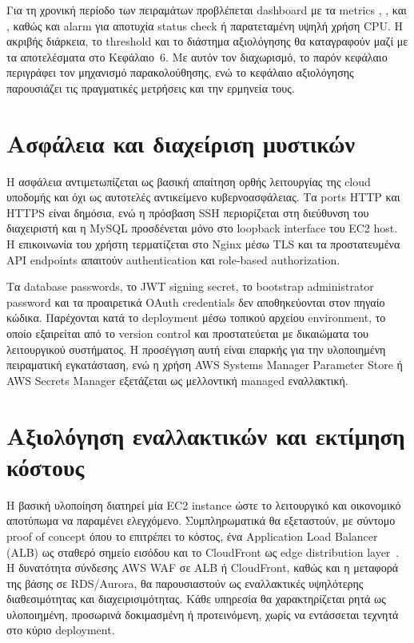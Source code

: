 Για τη χρονική περίοδο των πειραμάτων προβλέπεται dashboard με τα metrics
, ,  και
, καθώς και alarm για αποτυχία status check ή
παρατεταμένη υψηλή χρήση CPU. Η ακριβής διάρκεια, το threshold και το
διάστημα αξιολόγησης θα καταγραφούν μαζί με τα αποτελέσματα στο
Κεφάλαιο~6. Με αυτόν τον διαχωρισμό, το παρόν κεφάλαιο περιγράφει τον
μηχανισμό παρακολούθησης, ενώ το κεφάλαιο αξιολόγησης παρουσιάζει τις
πραγματικές μετρήσεις και την ερμηνεία τους.
\section{Ασφάλεια και διαχείριση μυστικών}
Η ασφάλεια αντιμετωπίζεται ως βασική απαίτηση ορθής λειτουργίας της cloud
υποδομής και όχι ως αυτοτελές αντικείμενο κυβερνοασφάλειας. Τα ports HTTP και
HTTPS είναι δημόσια, ενώ η πρόσβαση SSH περιορίζεται στη διεύθυνση του
διαχειριστή και η MySQL προσδένεται μόνο στο loopback interface του EC2 host.
Η επικοινωνία του χρήστη τερματίζεται στο Nginx μέσω TLS και τα προστατευμένα
API endpoints απαιτούν authentication και role-based authorization.

Τα database passwords, το JWT signing secret, το bootstrap administrator
password και τα προαιρετικά OAuth credentials δεν αποθηκεύονται στον πηγαίο
κώδικα. Παρέχονται κατά το deployment μέσω τοπικού αρχείου environment, το
οποίο εξαιρείται από το version control και προστατεύεται με δικαιώματα του
λειτουργικού συστήματος. Η προσέγγιση αυτή είναι επαρκής για την υλοποιημένη
πειραματική εγκατάσταση, ενώ η χρήση AWS Systems Manager Parameter Store ή
AWS Secrets Manager εξετάζεται ως μελλοντική managed εναλλακτική.

\section{Αξιολόγηση εναλλακτικών και εκτίμηση κόστους}
Η βασική υλοποίηση διατηρεί μία EC2 instance ώστε το λειτουργικό και οικονομικό
αποτύπωμα να παραμένει ελεγχόμενο. Συμπληρωματικά θα εξεταστούν, με σύντομο
proof of concept όπου το επιτρέπει το κόστος, ένα Application Load Balancer
(ALB)
ως σταθερό σημείο εισόδου και το CloudFront ως edge distribution
layer~\cite{aws2026cloudfront}. Η
δυνατότητα σύνδεσης AWS WAF σε ALB ή CloudFront, καθώς και η μεταφορά της
βάσης σε RDS/Aurora, θα παρουσιαστούν ως εναλλακτικές υψηλότερης
διαθεσιμότητας και διαχειρισιμότητας. Κάθε υπηρεσία θα χαρακτηρίζεται ρητά ως
υλοποιημένη, προσωρινά δοκιμασμένη ή προτεινόμενη, χωρίς να εντάσσεται τεχνητά
στο κύριο deployment.


